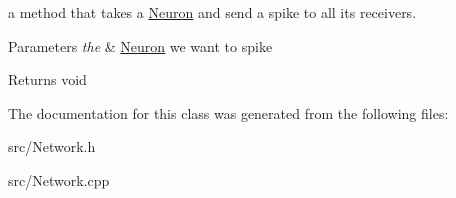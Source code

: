 a method that takes a \hyperlink{classNeuron}{Neuron} and send a spike to all its receivers. 


\begin{DoxyParams}{Parameters}
{\em the} & \hyperlink{classNeuron}{Neuron} we want to spike \\
\hline
\end{DoxyParams}
\begin{DoxyReturn}{Returns}
void 
\end{DoxyReturn}


The documentation for this class was generated from the following files\+:\begin{DoxyCompactItemize}
\item 
src/Network.\+h\item 
src/Network.\+cpp\end{DoxyCompactItemize}
